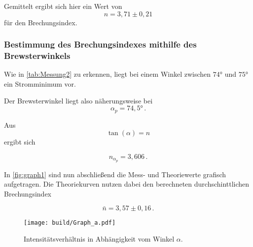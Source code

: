 Gemittelt ergibt sich hier ein Wert von
\begin{equation*}
    n = 3,71 \pm 0,21
\end{equation*}
für den Brechungsindex.

\newpage

\subsubsection{Bestimmung des Brechungsindexes mithilfe des Brewsterwinkels}

Wie in \autoref{tab:Messung2} zu erkennen, liegt bei einem Winkel zwischen $74°$ und $75°$ ein Stromminimum vor.

Der Brewsterwinkel liegt also näherungsweise bei
\begin{equation*}
    \alpha_p = 74,5 ° \,.
\end{equation*}

Aus
\begin{equation*}
    \tan(\alpha) = n 
\end{equation*}
ergibt sich

\begin{equation*}
    n_{\alpha_p} = 3,606 \,.
\end{equation*}

In \autoref{fig:graph1} sind nun abschließend die Mess- und Theoriewerte grafisch aufgetragen. Die Theoriekurven nutzen dabei den berechneten durchschinttlichen Brechungsindex

\begin{equation*}
    \bar{n} = 3,57 \pm 0,16 \,.
\end{equation*}

\begin{figure}
    \centering
    \texttt{[image: build/Graph\_a.pdf]}
    \caption{Intensitätsverhältnis in Abhängigkeit vom Winkel $\alpha$.}
    \label{fig:graph1}
\end{figure}
